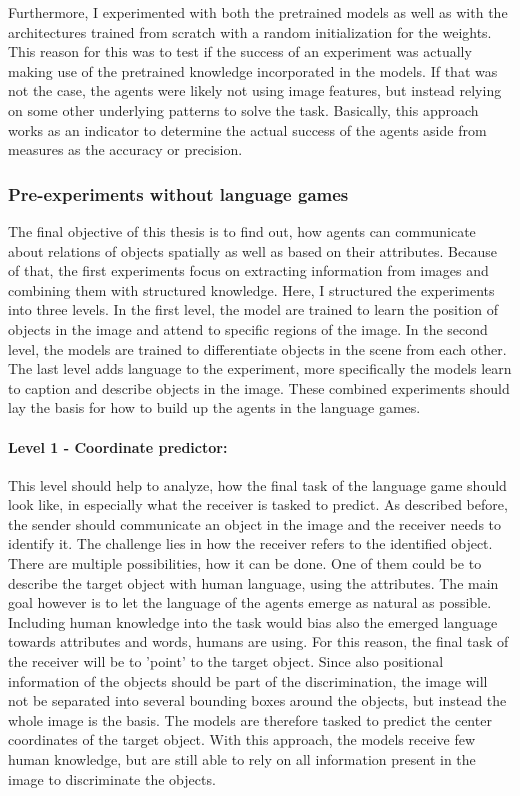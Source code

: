 Furthermore, I experimented with both the pretrained models as well as with the architectures trained from scratch with a random initialization for the weights.
This reason for this was to test if the success of an experiment was actually making use of the pretrained knowledge incorporated in the models.
If that was not the case, the agents were likely not using image features, but instead relying on some other underlying patterns to solve the task.
Basically, this approach works as an indicator to determine the actual success of the agents aside from measures as the accuracy or precision.


\subsubsection{Pre-experiments without language games}
The final objective of this thesis is to find out, how agents can communicate about relations of objects spatially as well as based on their attributes.
Because of that, the first experiments focus on extracting information from images and combining them with structured knowledge.
Here, I structured the experiments into three levels.
In the first level, the model are trained to learn the position of objects in the image and attend to specific regions of the image.
In the second level, the models are trained to differentiate objects in the scene from each other.
The last level adds language to the experiment, more specifically the models learn to caption and describe objects in the image.
These combined experiments should lay the basis for how to build up the agents in the language games.

\paragraph{Level 1 - Coordinate predictor:}

This level should help to analyze, how the final task of the language game should look like, in especially what the receiver is tasked to predict.
As described before, the sender should communicate an object in the image and the receiver needs to identify it.
The challenge lies in how the receiver refers to the identified object.
There are multiple possibilities, how it can be done.
One of them could be to describe the target object with human language, using the attributes.
The main goal however is to let the language of the agents emerge as natural as possible.
Including human knowledge into the task would bias also the emerged language towards attributes and words, humans are using.
For this reason, the final task of the receiver will be to 'point' to the target object.
Since also positional information of the objects should be part of the discrimination, the image will not be separated into several bounding boxes around the objects, but instead the whole image is the basis.
The models are therefore tasked to predict the center coordinates of the target object.
With this approach, the models receive few human knowledge, but are still able to rely on all information present in the image to discriminate the objects.

